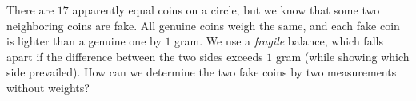 \problem{}
There are $17$ apparently equal coins on a circle, but we know that some two
neighboring coins are fake.
All genuine coins weigh the same, and each fake coin is lighter than a genuine one by
$1$ gram.
We use a \emph{fragile} balance, which falls apart if the difference between the two
sides exceeds $1$ gram (while showing which side prevailed).
How can we determine the two fake coins by two measurements without weights?
\solution
\endproblem
